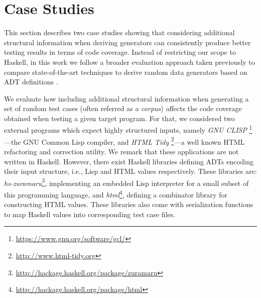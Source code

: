 \section{Case Studies} \label{sec:casestudies}

%
%
This section describes two case studies showing that considering additional
structural information when deriving generators can consistently produce better
testing results in terms of code coverage.
%
Instead of restricting our scope to Haskell, in this work we follow a broader
evaluation approach taken previously to compare state-of-the-art techniques to
derive random data generators based on ADT definitions
\cite{grieco2017,DBLP:conf/haskell/MistaRH18}.
%

We evaluate how including additional structural information when generating a
set of random test cases (often referred as a \emph{corpus}) affects the code
coverage obtained when testing a given target program.
%
For that, we considered two external programs which expect highly structured
inputs, namely \emph{GNU
  CLISP} \footnote{\href{https://www.gnu.org/software/gcl/}{https://www.gnu.org/software/gcl/}}---the
GNU Common Lisp compiler, and \emph{HTML Tidy}
\footnote{\href{http://www.html-tidy.org}{http://www.html-tidy.org}}---a well
known HTML refactoring and correction utility.
%
We remark that these applications are not written in Haskell.
%
However, there exist Haskell libraries defining ADTs encoding their input
structure, i.e., Lisp and HTML values respectively. These libraries are:
\emph{hs-zuramaru}\footnote{\href{http://hackage.haskell.org/package/zuramaru}{http://hackage.haskell.org/package/zuramaru}},
implementing an embedded Lisp interpreter for a small subset of this programming
language, and
\emph{html}\footnote{\href{http://hackage.haskell.org/package/html}{http://hackage.haskell.org/package/html}},
defining a combinator library for constructing HTML values.
%
These libraries also come with serialization functions to map Haskell values
into corresponding test case files.



